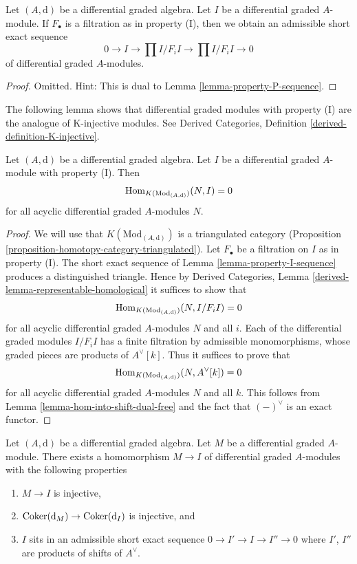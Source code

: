 \begin{lemma}
\label{lemma-property-I-sequence}
Let $(A, \text{d})$ be a differential graded algebra.
Let $I$ be a differential graded $A$-module. If $F_\bullet$
is a filtration as in property (I), then we obtain an
admissible short exact sequence
$$
0 \to I \to
\prod\nolimits I/F_iI \to
\prod\nolimits I/F_iI \to 0
$$
of differential graded $A$-modules.
\end{lemma}

\begin{proof}
Omitted. Hint: This is dual to Lemma \ref{lemma-property-P-sequence}.
\end{proof}

\noindent
The following lemma shows that differential graded modules with
property (I) are the analogue of K-injective modules. See
Derived Categories, Definition \ref{derived-definition-K-injective}.

\begin{lemma}
\label{lemma-property-I-K-injective}
Let $(A, \text{d})$ be a differential graded algebra.
Let $I$ be a differential graded $A$-module with property (I).
Then
$$
\mathop{\mathrm{Hom}}\nolimits_{K(\text{Mod}_{(A, \text{d})})}(N, I) = 0
$$
for all acyclic differential graded $A$-modules $N$.
\end{lemma}

\begin{proof}
We will use that $K(\text{Mod}_{(A, \text{d})})$ is a triangulated
category (Proposition \ref{proposition-homotopy-category-triangulated}).
Let $F_\bullet$ be a filtration on $I$ as in property (I).
The short exact sequence of Lemma \ref{lemma-property-I-sequence}
produces a distinguished triangle. Hence by
Derived Categories, Lemma \ref{derived-lemma-representable-homological}
it suffices to show that
$$
\mathop{\mathrm{Hom}}\nolimits_{K(\text{Mod}_{(A, \text{d})})}(N, I/F_iI) = 0
$$
for all acyclic differential graded $A$-modules $N$ and all $i$.
Each of the differential graded modules $I/F_iI$ has a finite filtration
by admissible monomorphisms, whose graded pieces are
products of $A^\vee[k]$. Thus it suffices to prove that
$$
\mathop{\mathrm{Hom}}\nolimits_{K(\text{Mod}_{(A, \text{d})})}(N, A^\vee[k]) = 0
$$
for all acyclic differential graded $A$-modules $N$ and all $k$.
This follows from Lemma \ref{lemma-hom-into-shift-dual-free}
and the fact that $(-)^\vee$ is an exact functor.
\end{proof}

\begin{lemma}
\label{lemma-good-sub}
Let $(A, \text{d})$ be a differential graded algebra.
Let $M$ be a differential graded $A$-module. There exists a homomorphism
$M \to I$ of differential graded $A$-modules with the following
properties
\begin{enumerate}
\item $M \to I$ is injective,
\item $\mathop{\mathrm{Coker}}(\text{d}_M) \to \mathop{\mathrm{Coker}}(\text{d}_I)$ is injective,
and
\item $I$ sits in an admissible short exact sequence
$0 \to I' \to I \to I'' \to 0$ where $I'$, $I''$ are products
of shifts of $A^\vee$.
\end{enumerate}
\end{lemma}


